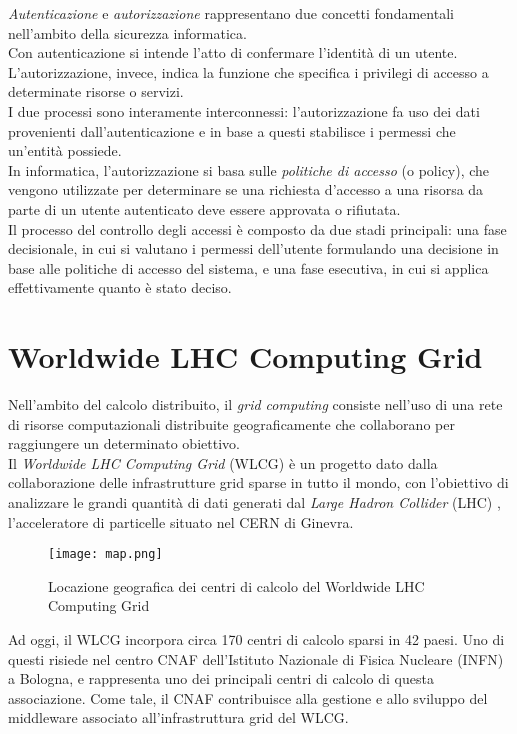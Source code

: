 \textit{Autenticazione} e \textit{autorizzazione} rappresentano due concetti fondamentali nell'ambito della
 sicurezza informatica.
 \\ Con autenticazione si intende l'atto di confermare l'identità di un utente. 
 L'autorizzazione, invece, indica la funzione che specifica i privilegi di accesso a determinate risorse o servizi.
\\I due processi sono interamente interconnessi: l'autorizzazione fa uso dei dati provenienti 
dall'autenticazione e in base a questi stabilisce i 
permessi che un'entità possiede.
\\ In informatica, l'autorizzazione si basa sulle \textit{politiche di accesso} (o policy), che vengono utilizzate per determinare se 
una richiesta d'accesso a una risorsa da parte di un utente autenticato deve essere approvata o rifiutata.
\\ Il processo del controllo degli accessi è composto da due stadi principali: una fase decisionale, in cui si valutano i permessi dell'utente 
 formulando una decisione in base alle politiche di accesso del sistema,
e una fase esecutiva, in cui si applica effettivamente quanto è stato deciso. 

\section{Worldwide LHC Computing Grid}
Nell'ambito del calcolo distribuito, il \textit{grid computing} consiste 
nell'uso di una rete di risorse computazionali distribuite geograficamente che collaborano 
per raggiungere un determinato obiettivo.
\\ Il \textit{Worldwide LHC Computing Grid} (WLCG) \cite{wlcg_doc} è un progetto dato dalla
 collaborazione 
delle infrastrutture grid sparse in tutto il mondo, con l'obiettivo
di analizzare le grandi quantità di dati generati dal \textit{Large Hadron Collider} (LHC) \cite{cern_lhc}, 
l'acceleratore di particelle situato nel CERN di Ginevra. 
\begin{figure}[h]
    \texttt{[image: map.png]}
    \centering
    \caption{Locazione geografica dei centri di calcolo del Worldwide LHC Computing Grid}
    \label{mappa}
\end{figure}

Ad oggi, il WLCG incorpora circa 170 centri di calcolo sparsi in 42 paesi. 
Uno di questi risiede nel centro CNAF dell'Istituto Nazionale di Fisica Nucleare (INFN) \cite{infn_cnaf} a Bologna,
 e rappresenta uno dei principali centri di calcolo di questa associazione. Come tale, il CNAF contribuisce
  alla gestione e allo sviluppo del middleware associato all'infrastruttura grid del WLCG. 


